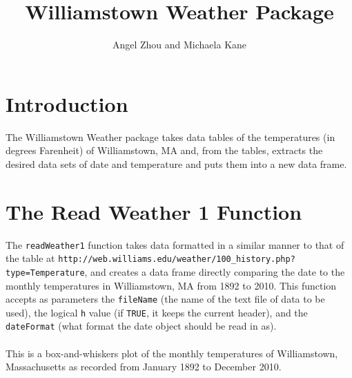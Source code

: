 \documentclass{article}\usepackage{graphicx, color}
\begin{document}
\title{Williamstown Weather Package}
\author{Angel Zhou and Michaela Kane}
\maketitle

\section*{Introduction}

The Williamstown Weather package takes data tables of the temperatures
(in degrees Farenheit) of Williamstown, MA and, from the tables,
extracts the desired data sets of date and temperature and puts them
into a new data frame.

\section*{The Read Weather 1 Function}
The \verb+readWeather1+ function takes data formatted in a similar
manner to that of the table at
\verb+http://web.williams.edu/weather/100_history.php?type=Temperature+,
and creates a data frame directly comparing the date to the monthly
temperatures in Williamstown, MA from 1892 to 2010. This function
accepts as parameters the \verb+fileName+ (the name of the text file
of data to be used), the logical \verb+h+ value (if \verb+TRUE+, it
keeps the current header), and the \verb+dateFormat+ (what format the
date object should be read in as).
\\
\\
This is a box-and-whiskers plot of the monthly temperatures of
Williamstown, Massachusetts as recorded from January 1892 to December 2010.
\end{document}
